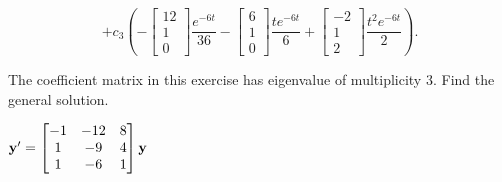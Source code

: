 \documentclass{ximera}
\begin{document}
\begin{problem}
\begin{solution}
$$+c_3\left(-\begin{bmatrix}12\\1\\0\end{bmatrix}\frac{e^{-6t} }{36}-\begin{bmatrix}6\\1\\0\end{bmatrix}\frac{t
e^{-6t} }{6}+\begin{bmatrix}-2\\1\\2\end{bmatrix}\frac{t^2e^{-6t} }{2}\right).$$

\end{solution}
 \end{problem}

 \begin{problem}\label{exer:10.5.29} 
 The coefficient matrix in this exercise
has eigenvalue of multiplicity $3$. Find the
general solution.

$ {\bf y}'
= \begin{bmatrix}-1&-12&8\\1&-9&4\\1&-6&1\end{bmatrix}{\bf y}$
 \end{problem}
\end{document}
